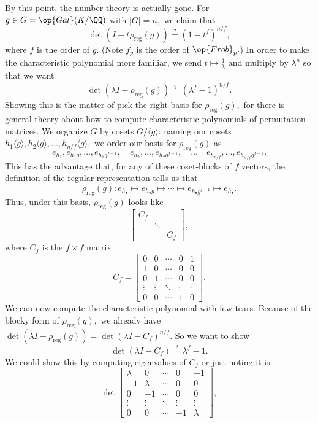 By this point, the number theory is actually gone. For $g\in G=\op{Gal}(K/\QQ)$ with $|G|=n,$ we claim that
\[\det(I-t\rho_{\text{reg}}(g))\stackrel?=\left(1-t^f\right)^{n/f},\]
where $f$ is the order of $g.$ (Note $f_p$ is the order of $\op{Frob}_p.$) In order to make the characteristic polynomial more familiar, we send $t\mapsto\frac1\lambda$ and multiply by $\lambda^n$ so that we want
\[\det(\lambda I-\rho_{\text{reg}}(g))\stackrel?=\left(\lambda^f-1\right)^{n/f}.\]
Showing this is the matter of pick the right basis for $\rho_{\text{reg}}(g),$ for there is general theory about how to compute characteristic polynomials of permutation matrices. We organize $G$ by cosets $G/\langle g\rangle$: naming our cosets $h_1\langle g\rangle,h_2\langle g\rangle,\ldots,h_{n/f}\langle g\rangle,$ we order our basis for $\rho_{\text{reg}}(g)$ as
\[e_{h_1},e_{h_1g},\ldots,e_{h_1g^{f-1}},\quad e_{h_2},\ldots,e_{h_2g^{f-1}},\quad\ldots\quad e_{h_{n/f}},\ldots,e_{h_{n/f}g^{f-1}}.\]
This has the advantage that, for any of these coset-blocks of $f$ vectors, the definition of the regular representation tells us that
\[\rho_{\text{reg}}(g):e_{h_\bullet}\mapsto e_{h_\bullet g}\mapsto\cdots\mapsto e_{h_\bullet g^{f-1}}\mapsto e_{h_\bullet}.\]
Thus, under this basis, $\rho_{\text{reg}}(g)$ looks like
\[\begin{bmatrix}
    C_f \\ & \ddots \\ & & C_f
\end{bmatrix},\]
where $C_f$ is the $f\times f$ matrix
\[C_f=\begin{bmatrix}
    0 & 0 & \cdots & 0 & 1 \\
    1 & 0 & \cdots & 0 & 0 \\
    0 & 1 & \cdots & 0 & 0 \\
    \vdots & \vdots & \ddots & \vdots & \vdots \\
    0 & 0 & \cdots & 1 & 0
\end{bmatrix}.\]
We can now compute the characteristic polynomial with few tears. Because of the blocky form of $\rho_{\text{reg}}(g),$ we already have $\det(\lambda I-\rho_{\text{reg}}(g))=\det(\lambda I-C_f)^{n/f}.$ So we want to show
\[\det(\lambda I-C_f)\stackrel?=\lambda^f-1.\]
We could show this by computing eigenvalues of $C_f$ or just noting it is
\[\det\begin{bmatrix}
    \lambda & 0 & \cdots & 0 & -1 \\
    -1 & \lambda & \cdots & 0 & 0 \\
    0 & -1 & \cdots & 0 & 0 \\
    \vdots & \vdots & \ddots & \vdots & \vdots \\
    0 & 0 & \cdots & -1 & \lambda
\end{bmatrix},\]
